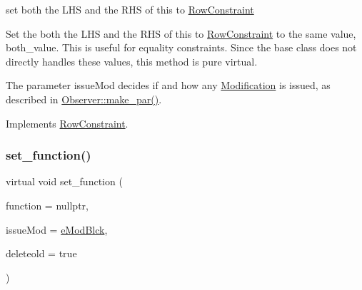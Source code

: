 set both the L\+HS and the R\+HS of this to \mbox{\hyperlink{class_s_m_spp__di__unipi__it_1_1_row_constraint}{Row\+Constraint}} 

Set the both the L\+HS and the R\+HS of this to \mbox{\hyperlink{class_s_m_spp__di__unipi__it_1_1_row_constraint}{Row\+Constraint}} to the same value, both\+\_\+value. This is useful for equality constraints. Since the base class does not directly handles these values, this method is pure virtual.

The parameter issue\+Mod decides if and how any \mbox{\hyperlink{class_s_m_spp__di__unipi__it_1_1_modification}{Modification}} is issued, as described in \mbox{\hyperlink{class_s_m_spp__di__unipi__it_1_1_observer_a2d499ae38e5e95cf66cd71da32b0694a}{Observer\+::make\+\_\+par()}}. 

Implements \mbox{\hyperlink{class_s_m_spp__di__unipi__it_1_1_row_constraint_abe9589ef7ede6b4d5b0c0a1cbe72b5b7}{Row\+Constraint}}.

\mbox{\label{class_s_m_spp__di__unipi__it_1_1_f_row_constraint_a91173cc091286d4bc102d8f54d564c1e}} 
\subsubsection{\texorpdfstring{set\+\_\+function()}{set\_function()}}
{\footnotesize\ttfamily virtual void set\+\_\+function (\begin{DoxyParamCaption}\item[{\mbox{\hyperlink{class_s_m_spp__di__unipi__it_1_1_function}{Function}} $\ast$const}]{function = {\ttfamily nullptr},  }\item[{\mbox{\hyperlink{group___modification___t_y_p_e_s_ga544246d8c462e9a2d817c2c30797968f}{c\+\_\+\+Mod\+Param}}}]{issue\+Mod = {\ttfamily \mbox{\hyperlink{group___modification___t_y_p_e_s_gga48fddcdd03a03f49b7e389ca1ed938d4a21b14b26b1c0093a0905f6fc010bad29}{e\+Mod\+Blck}}},  }\item[{bool}]{deleteold = {\ttfamily true} }\end{DoxyParamCaption})\hspace{0.3cm}{\ttfamily [virtual]}}



